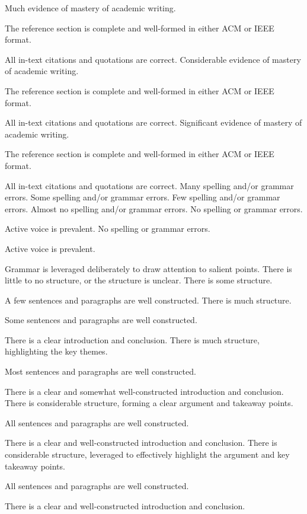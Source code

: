 \documentclass{../../fal_assignment}
\begin{document}
\begin{markingrubric}
        \grade 		Much evidence of mastery of academic writing.
        \par 		The reference section is complete and well-formed in either ACM or IEEE format.
        \par 		All in-text citations and quotations are correct.
        \grade 		Considerable evidence of mastery of academic writing.
        \par 		The reference section is complete and well-formed in either ACM or IEEE format.
        \par 		All in-text citations and quotations are correct.
        \grade 		Significant evidence of mastery of academic writing.
        \par 		The reference section is complete and well-formed in either ACM or IEEE format.
        \par 		All in-text citations and quotations are correct.
%
        \grade  \fail	Many spelling and/or grammar errors.
        \grade 		Some spelling and/or grammar errors.  
        \grade 		Few spelling and/or grammar errors.
        \grade 		Almost no spelling and/or grammar errors.
        \grade 		No spelling or grammar errors.
        \par 		Active voice is prevalent.
        \grade 		No spelling or grammar errors.
        \par 		Active voice is prevalent.
        \par 		Grammar is leveraged deliberately to draw attention to salient points.     
%
        \grade\fail 	There is little to no structure, or the structure is unclear.
        \grade 		There is some structure.
        \par 		A few sentences and paragraphs are well constructed.
        \grade 		There is much structure.
        \par 		Some sentences and paragraphs are well constructed.
        \par 		There is a clear introduction and conclusion.
        \grade 		There is much structure, highlighting the key themes.
        \par 		Most sentences and paragraphs are well constructed.
        \par 		There is a clear and somewhat well-constructed introduction and conclusion.
        \grade 		There is considerable structure, forming a clear argument and takeaway points.
        \par 		All sentences and paragraphs are well constructed.
        \par 		There is a clear and well-constructed introduction and conclusion.
        \grade 		There is considerable structure, leveraged to effectively highlight the argument and key takeaway points.
        \par 		All sentences and paragraphs are well constructed.   
        \par 		There is a clear and well-constructed introduction and conclusion.
\end{markingrubric}
\end{document}
